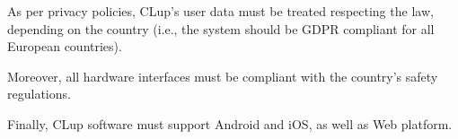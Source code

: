 \documentclass[../../main.tex]{subfiles}
\begin{document}
	As per privacy policies, CLup's user data must be treated respecting the law, depending on the 
	country (i.e., the system should be GDPR compliant for all European countries).

	Moreover, all hardware interfaces must be compliant with the country's safety regulations.
	
	Finally, CLup software must support Android and iOS, as well as Web platform.
\end{document}
